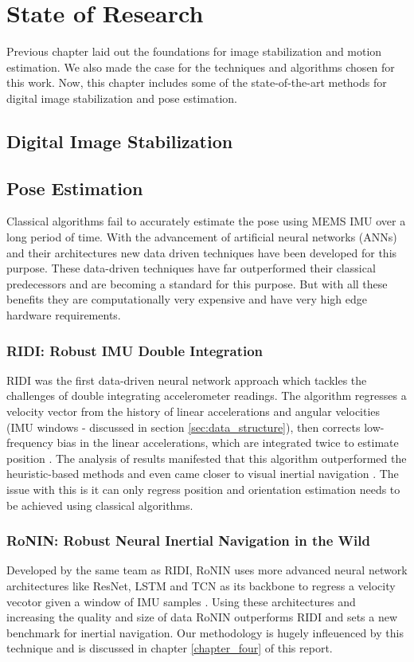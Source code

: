 \chapter{State of Research} \label{chapter_three}

Previous chapter laid out the foundations for image stabilization and motion estimation. We also made the case for the techniques and algorithms chosen for this work. Now, this chapter includes some of the state-of-the-art methods for digital image stabilization and pose estimation. 

\section{Digital Image Stabilization}



\section{Pose Estimation}
\label{sec:sota_pose_est}
Classical algorithms fail to accurately estimate the pose using MEMS IMU over a long period of time. With the advancement of artificial neural networks (ANNs) and their architectures new data driven techniques have been developed for this purpose. These data-driven techniques have far outperformed their classical predecessors and are becoming a standard for this purpose. But with all these benefits they are computationally very expensive and have very high edge hardware requirements. 

\subsection{RIDI: Robust IMU Double Integration}
RIDI was the first data-driven neural network approach which tackles the challenges of double integrating accelerometer readings. The algorithm regresses a velocity vector from the history of linear accelerations and angular velocities (IMU windows - discussed in section \ref{sec:data_structure}), then corrects low-frequency bias in the linear accelerations, which are integrated twice to estimate position \citep{yan2018ridi}. The analysis of results manifested that this algorithm outperformed the heuristic-based methods and even came closer to visual inertial navigation \citep{yan2018ridi}. The issue with this is it can only regress position and orientation estimation needs to be achieved using classical algorithms.

\subsection{RoNIN: Robust Neural Inertial Navigation in the Wild}
Developed by the same team as RIDI, RoNIN uses more advanced neural network architectures like ResNet, LSTM and TCN as its backbone to regress a velocity vecotor given a window of IMU samples \citep{herath2020ronin}. Using these architectures and increasing the quality and size of data RoNIN outperforms RIDI and sets a new benchmark for inertial navigation. Our methodology is hugely infleuenced by this technique and is discussed in chapter \ref{chapter_four} of this report.

